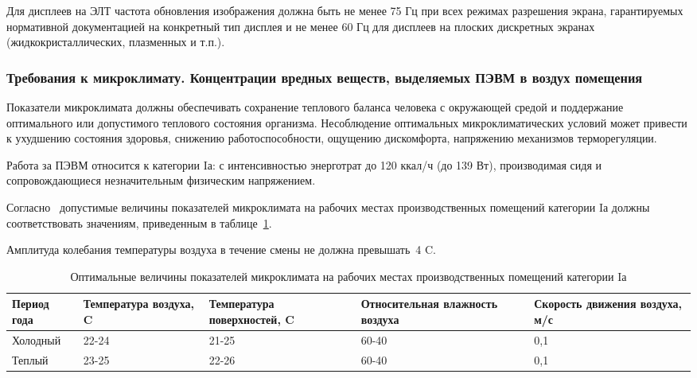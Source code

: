 Для дисплеев на ЭЛТ частота обновления изображения должна быть не менее 75 Гц при всех режимах 
разрешения экрана, гарантируемых нормативной документацией на конкретный тип дисплея и не менее 60 Гц 
для дисплеев на плоских дискретных экранах (жидкокристаллических, плазменных и т.п.).~\cite{sanpin_2.4.1340-03}


\subsubsection{Требования к микроклимату. Концентрации вредных веществ, выделяемых ПЭВМ в воздух помещения}


 Показатели микроклимата должны обеспечивать сохранение теплового баланса человека с окружающей средой и 
 поддержание оптимального или допустимого теплового состояния организма.
 Несоблюдение оптимальных микроклиматических условий может привести к ухудшению состояния здоровья,
 снижению работоспособности, ощущению дискомфорта, напряжению механизмов терморегуляции.
 
 Работа за ПЭВМ относится к категории Iа: с интенсивностью энерготрат до 120 ккал/ч (до 139 Вт), 
 производимая сидя и сопровождающиеся незначительным физическим напряжением.~\cite{sanpin_mikroclimate} 
 
 Согласно~\cite{sanpin_mikroclimate} допустимые величины показателей микроклимата на рабочих местах производственных помещений категории Iа 
 должны соответствовать значениям, приведенным в таблице~\ref{tab:climate_1}. 
 
 Амплитуда колебания температуры воздуха в течение смены не должна превышать~4\textdegree{} C.
 
\begin{table}[h!]
\caption{ Оптимальные величины показателей микроклимата на рабочих местах производственных помещений категории Iа }
\label{tab:climate_1}
\begin{center}
\begin{tabularx}{\linewidth}{|X|X|X|X|X|}
\hline
Период года & Температура воздуха, \textdegree{}C & Температура поверхностей, \textdegree{}C & Относительная влажность воздуха & Скорость движения воздуха, м/с\\
\hline
Холодный & 22-24 & 21-25 & 60-40 & 0,1\\
\hline
Теплый & 23-25 & 22-26 & 60-40 & 0,1\\
\hline
\end{tabularx}
\end{center}
\end{table}


